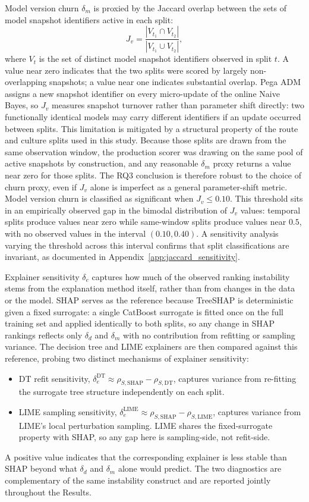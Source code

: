 \documentclass[oneside]{memoir} %
\begin{document}
Model version churn $\delta_m$ is proxied by the Jaccard overlap between the sets of model snapshot identifiers active in each split:
\[
J_v = \frac{|V_{t_1} \cap V_{t_2}|}{|V_{t_1} \cup V_{t_2}|},
\]
where $V_t$ is the set of distinct model snapshot identifiers observed in split $t$. A value near zero indicates that the two splits were scored by largely non-overlapping snapshots; a value near one indicates substantial overlap. Pega ADM assigns a new snapshot identifier on every micro-update of the online Naive Bayes, so $J_v$ measures snapshot turnover rather than parameter shift directly: two functionally identical models may carry different identifiers if an update occurred between splits. This limitation is mitigated by a structural property of the route and culture splits used in this study. Because those splits are drawn from the same observation window, the production scorer was drawing on the same pool of active snapshots by construction, and any reasonable $\delta_m$ proxy returns a value near zero for those splits. The RQ3 conclusion is therefore robust to the choice of churn proxy, even if $J_v$ alone is imperfect as a general parameter-shift metric. Model version churn is classified as significant when $J_v \leq 0.10$. This threshold sits in an empirically observed gap in the bimodal distribution of $J_v$ values: temporal splits produce values near zero while same-window splits produce values near $0.5$, with no observed values in the interval $(0.10, 0.40)$. A sensitivity analysis varying the threshold across this interval confirms that split classifications are invariant, as documented in Appendix~\ref{app:jaccard_sensitivity}.

Explainer sensitivity $\delta_e$ captures how much of the observed ranking instability stems from the explanation method itself, rather than from changes in the data or the model. SHAP serves as the reference because TreeSHAP is deterministic given a fixed surrogate: a single CatBoost surrogate is fitted once on the full training set and applied identically to both splits, so any change in SHAP rankings reflects only $\delta_d$ and $\delta_m$ with no contribution from refitting or sampling variance. The decision tree and LIME explainers are then compared against this reference, probing two distinct mechanisms of explainer sensitivity:
\begin{itemize}
\item DT refit sensitivity, $\delta_e^{\text{DT}} \approx \rho_{S,\text{SHAP}} - \rho_{S,\text{DT}}$, captures variance from re-fitting the surrogate tree structure independently on each split.
\item LIME sampling sensitivity, $\delta_e^{\text{LIME}} \approx \rho_{S,\text{SHAP}} - \rho_{S,\text{LIME}}$, captures variance from LIME's local perturbation sampling. LIME shares the fixed-surrogate property with SHAP, so any gap here is sampling-side, not refit-side.
\end{itemize}
A positive value indicates that the corresponding explainer is less stable than SHAP beyond what $\delta_d$ and $\delta_m$ alone would predict. The two diagnostics are complementary of the same instability construct and are reported jointly throughout the Results.
\end{document}

